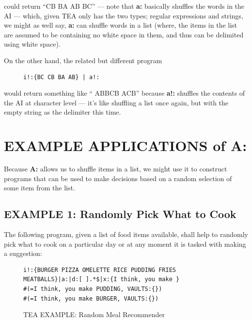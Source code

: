 \documentclass[a4paper, 18pt]{book} %
\begin{document}
could return “CB BA AB BC” --- note that \textbf{a:} basically shuffles the words in the AI --- which, given TEA only has the two types; regular expressions and strings, we might as well say, \textbf{a:} can shuffle words in a list (where, the items in the list are assumed to be containing no white space in them, and thus can be delimited using white space). 

On the other hand, the related but different program


 \begin{figure}[H]
 \Large
  \centering
  \begin{tcolorbox}[teaterminalstyle, title=TEA Program: shuffling a list of symbols]
  \begin{lstlisting}[language=TEA]
i!:{BC CB BA AB} | a!:
   \end{lstlisting}
  \end{tcolorbox}
\end{figure}

would return something like “  ABBCB ACB” because \textbf{a!:} shuffles the contents of the AI at character level --- it's like shuffling a list once again, but with the empty string as the delimiter this time.


\section{EXAMPLE APPLICATIONS of A:}
\label{SECEXAMPA}

Because \textbf{A:} allows us to shuffle items in a list, we might use it to construct programs that can be used to make decisions based on a random selection of some item from the list. 

\subsection{EXAMPLE 1: Randomly Pick What to Cook}
\label{SECEXAMP1A}

The following program, given a list of food items available, shall help to randomly pick what to cook on a particular day or at any moment it is tasked with making a suggestion:


 \begin{figure}[H]
 \Large
  \centering
  \begin{tcolorbox}[teaterminalstyle, title=TEA Program: randomly suggest what to cook]
  \begin{lstlisting}[language=TEA]
i!:{BURGER PIZZA OMELETTE RICE PUDDING FRIES 
MEATBALLS}|a:|d:[ ].*$|x:{I think, you make }
#(=I think, you make PUDDING, VAULTS:{})
#(=I think, you make BURGER, VAULTS:{})
   \end{lstlisting}
  \end{tcolorbox}
  \caption{TEA EXAMPLE: Random Meal Recommender}
  \label{FIGA3}
\end{figure}
\end{document}
